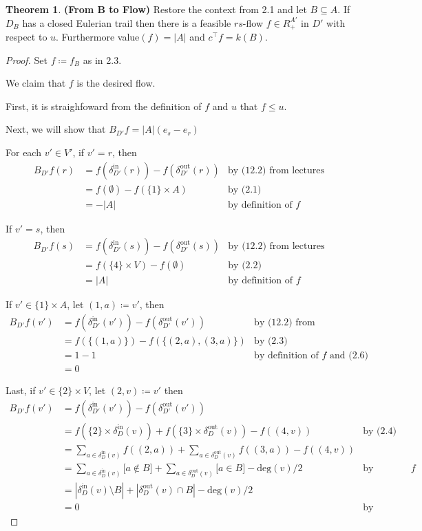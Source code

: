 \documentclass[a4paper,10pt, leqno]{article}
\theoremstyle{definition}
\begin{document}
\newtheorem{theorem}{Theorem}
\begin{theorem}{\textbf{(From B to Flow)}}
 Restore the context from 2.1 and let $B \subseteq A$. If $D_B$ has a closed Eulerian trail then there is a feasible $rs$-flow $f \in R_+^{A'}$ in $D'$ with respect to $u$. Furthermore value$(f) = |A|$ and $c^\intercal f = k(B)$.
\end{theorem}
\begin{proof}
Set $f \coloneqq f_B$ as in 2.3. 

We claim that $f$ is the desired flow.

First, it is straighfoward from the definition of $f$ and $u$ that $f \leq u$.

Next, we will show that $B_{D'}f = |A|(e_s - e_r)$

For each $v' \in V'$, if $v' = r$, then 
\begin{align*}
B_{D'}f(r) &= f(\delta_{D'}^\text{in}(r)) - f(\delta_{D'}^\text{out}(r)) &\text{by (12.2) from lectures} \\
&= f(\emptyset) - f(\{1\} \times A) &\text{by (2.1)}\\
&= -|A| &\text{by definition of }f
\end{align*}

If $v' = s$, then 
\begin{align*}
B_{D'}f(s) &= f(\delta_{D'}^\text{in}(s)) - f(\delta_{D'}^\text{out}(s)) &\text{by (12.2) from lectures} \\
&= f(\{4\} \times V) - f(\emptyset) &\text{by (2.2)}\\
&= |A| &\text{by definition of }f
\end{align*}

If $v' \in \{1\} \times A$, let $(1, a) \coloneqq v'$, then 
\begin{align*}
B_{D'}f(v') &= f(\delta_{D'}^\text{in}(v')) - f(\delta_{D'}^\text{out}(v')) &\text{by (12.2) from lectures} \\
&= f(\{(1, a)\}) - f(\{(2, a), (3, a)\}) &\text{by (2.3)}\\
&= 1 - 1 &\text{by definition of }f \text{ and (2.6)} \\
&= 0
\end{align*}

Last, if $v' \in \{2\} \times V$, let $(2, v) \coloneqq v'$ then 
\begin{align*}
B_{D'}f(v') &= f(\delta_{D'}^\text{in}(v')) - f(\delta_{D'}^\text{out}(v')) \\
&= f(\{2\} \times \delta_D^\text{in}(v)) + f(\{3\} \times \delta_D^\text{out}(v)) -  f((4, v))&\text{by (2.4)} \\
&= \sum_{a \in \delta_D^\text{in}(v)}{f((2, a))} + \sum_{a \in \delta_D^\text{out}(v)}{f((3, a))} -  f((4, v)) \\
&= \sum_{a \in \delta_D^\text{in}(v)}{\lbrack a \notin B \rbrack} + \sum_{a \in \delta_D^\text{out}(v)}{\lbrack a \in B \rbrack} - \text{deg}(v)/2 &\text{by definition of }f\\ 
&= |\delta_D^\text{in}(v) \setminus B| + |\delta_D^\text{out}(v) \cap B| - \text{deg}(v)/2 \\
&= 0 &\text{by proposition 2}
\end{align*}


\end{proof}
\end{document}
